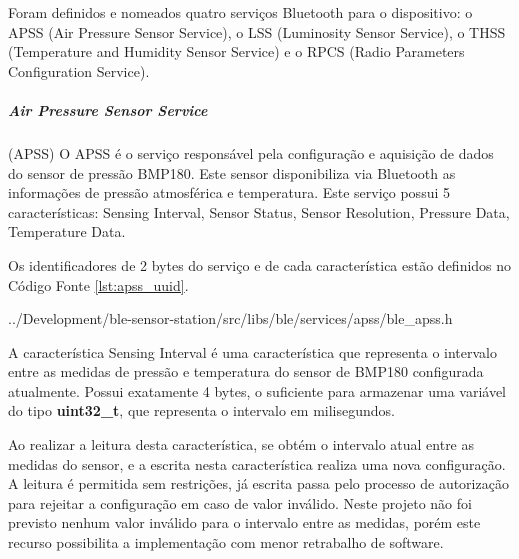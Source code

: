 Foram definidos e nomeados quatro serviços Bluetooth para o dispositivo: o APSS
(Air Pressure Sensor Service), o LSS (Luminosity Sensor Service), o THSS
(Temperature and Humidity Sensor Service) e o RPCS (Radio Parameters
Configuration Service).

\newpage
\subparagraph{Air Pressure Sensor Service}(APSS) 
\newline
O APSS é o serviço responsável pela configuração e aquisição de dados do sensor
de pressão BMP180. Este sensor disponibiliza via Bluetooth as informações de
pressão atmosférica e temperatura. Este serviço possui 5 características:
Sensing Interval, Sensor Status, Sensor Resolution, Pressure Data, Temperature
Data.


Os identificadores de 2 bytes do serviço e de cada característica estão
definidos no Código Fonte \ref{lst:apss_uuid}. 

\begin{minipage}{0.95\linewidth}

{../Development/ble-sensor-station/src/libs/ble/services/apss/ble_apss.h}
\end{minipage}

A característica Sensing Interval é uma característica que representa o
intervalo entre as medidas de pressão e temperatura do sensor de BMP180
configurada atualmente. Possui exatamente 4 bytes, o suficiente para armazenar
uma variável do tipo \textbf{uint32\_t}, que representa o intervalo em
milisegundos.

Ao realizar a leitura desta característica, se obtém o intervalo atual entre as
medidas do sensor, e a escrita nesta característica realiza uma nova
configuração. A leitura é permitida sem restrições, já escrita passa pelo
processo de autorização para rejeitar a configuração em caso de valor
inválido. Neste projeto não foi previsto nenhum valor inválido para o intervalo
entre as medidas, porém este recurso possibilita a implementação com menor
retrabalho de software.

